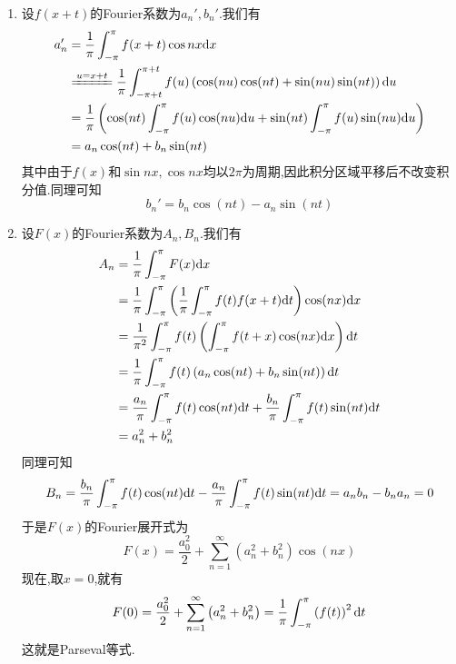 \documentclass{ctexart}
\begin{document}
\begin{solution}
    \begin{enumerate}[label=\tbf{(\arabic*)},topsep=0pt,parsep=0pt,itemsep=0pt,partopsep=0pt]
        \item 设$f(x+t)$的Fourier系数为$a_n',b_n'$.我们有
            \[\begin{aligned}
                a_n'
                &= \dfrac{1}{\pi}\int_{-\pi}^{\pi}f(x+t)\cos nx\di x \\
                &\xlongequal{u=x+t}\dfrac{1}{\pi}\int_{-\pi+t}^{\pi+t}f(u)\left(\cos(nu)\cos(nt)+\sin(nu)\sin(nt)\right)\di u \\
                &= \dfrac{1}{\pi}\left(\cos(nt)\int_{-\pi}^{\pi}f(u)\cos(nu)\di u+\sin(nt)\int_{-\pi}^{\pi}f(u)\sin(nu)\di u\right) \\
                &= a_n\cos(nt)+b_n\sin(nt)
            \end{aligned}\]
            其中由于$f(x)$和$\sin nx,\cos nx$均以$2\pi$为周期,因此积分区域平移后不改变积分值.同理可知
            \[b_n'=b_n\cos(nt)-a_n\sin(nt)\]
        \item 设$F(x)$的Fourier系数为$A_n,B_n$.我们有
            \[\begin{aligned}
                A_n
                &= \dfrac{1}{\pi}\int_{-\pi}^{\pi}F(x)\mathrm{d} x \\
                &= \dfrac{1}{\pi}\int_{-\pi}^{\pi}\left(\dfrac{1}{\pi}\int_{-\pi}^{\pi}f(t)f(x+t)\mathrm{d} t\right)\cos(nx)\mathrm{d} x \\
                &= \dfrac{1}{\pi^2}\int_{-\pi}^{\pi}f(t)\left(\int_{-\pi}^{\pi}f(t+x)\cos(nx)\mathrm{d} x\right)\mathrm{d} t \\
                &= \dfrac{1}{\pi}\int_{-\pi}^{\pi}f(t)\left(a_n\cos(nt)+b_n\sin(nt)\right)\mathrm{d} t \\
                &= \dfrac{a_n}{\pi}\int_{-\pi}^{\pi}f(t)\cos(nt)\mathrm{d} t+\dfrac{b_n}{\pi}\int_{-\pi}^{\pi}f(t)\sin(nt)\mathrm{d} t \\
                &= a_n^2+b_n^2
            \end{aligned}\]
            同理可知
            \[B_n=\dfrac{b_n}{\pi}\int_{-\pi}^{\pi}f(t)\cos(nt)\mathrm{d} t-\dfrac{a_n}{\pi}\int_{-\pi}^{\pi}f(t)\sin(nt)\mathrm{d} t=a_nb_n-b_na_n=0\]
            于是$F(x)$的Fourier展开式为
            \[F(x)=\dfrac{a_0^2}{2}+\sum_{n=1}^{\infty}\left(a_n^2+b_n^2\right)\cos(nx)\]
            现在,取$x=0$,就有
            \[F(0)=\dfrac{a_0^2}{2}+\sum_{n=1}^{\infty}\left(a_n^2+b_n^2\right)=\dfrac{1}{\pi}\int_{-\pi}^{\pi}\left(f(t)\right)^2\mathrm{d} t\]
            这就是Parseval等式.
    \end{enumerate}
\end{solution}
\end{document}
